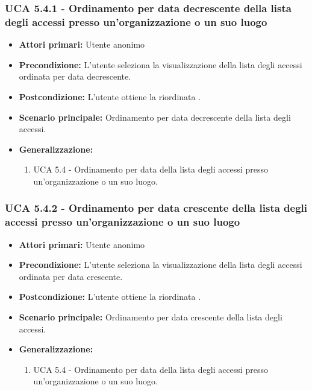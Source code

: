 \subsubsection{UCA 5.4.1 - Ordinamento per data decrescente della lista degli accessi presso un'organizzazione o un suo luogo}
\begin{itemize}
	\item \textbf{Attori primari:} Utente anonimo
	\item \textbf{Precondizione:} L'utente seleziona la visualizzazione della lista degli accessi ordinata per data decrescente.
	\item \textbf{Postcondizione:} L'utente ottiene la  riordinata .
	\item \textbf{Scenario principale:} Ordinamento per data decrescente della lista degli accessi.
	\item \textbf{Generalizzazione:}
	\begin{enumerate}
		\item UCA 5.4 - Ordinamento per data della lista degli accessi presso un'organizzazione o un suo luogo.
	\end{enumerate} 
\end{itemize}

\subsubsection{UCA 5.4.2 - Ordinamento per data crescente della lista degli accessi presso un'organizzazione o un suo luogo}
\begin{itemize}
    \item \textbf{Attori primari:} Utente anonimo
    \item \textbf{Precondizione:} L'utente seleziona la visualizzazione della lista degli accessi ordinata per data crescente.
    \item \textbf{Postcondizione:} L'utente ottiene la  riordinata .
    \item \textbf{Scenario principale:} Ordinamento per data crescente della lista degli accessi.
    \item \textbf{Generalizzazione:}
	\begin{enumerate}
		\item UCA 5.4 - Ordinamento per data della lista degli accessi presso un'organizzazione o un suo luogo.
	\end{enumerate}
\end{itemize}

